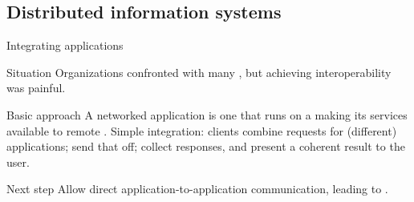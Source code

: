 \subsection{Distributed information systems}
\begin{slide}{Integrating applications}

  \begin{block}{Situation}
    Organizations confronted with many , but achieving interoperability was
    painful.
  \end{block}

  \begin{block}{Basic approach}
    A networked application is one that runs on a  making its services available to remote
    . Simple integration: clients combine requests for (different) applications; send that off;
    collect responses, and present a coherent result to the user.
  \end{block}

  \begin{block}{Next step}
    Allow direct application-to-application communication, leading to .
  \end{block}

\end{slide}
